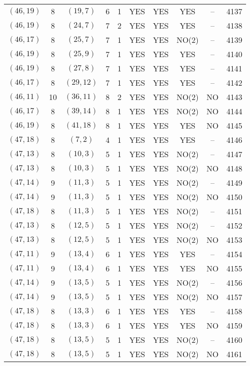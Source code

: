 \begin{longtable}{|c|c|c|c|c|c|c|c|c|c|}
$(46, 19)$ & 8 & $(19, 7)$ & 6 & 1 & YES & YES & YES & -- & 4137\\
$(46, 19)$ & 8 & $(24, 7)$ & 7 & 2 & YES & YES & YES & -- & 4138\\
$(46, 17)$ & 8 & $(25, 7)$ & 7 & 1 & YES & YES & NO(2) & -- & 4139\\
$(46, 19)$ & 8 & $(25, 9)$ & 7 & 1 & YES & YES & YES & -- & 4140\\
$(46, 19)$ & 8 & $(27, 8)$ & 7 & 1 & YES & YES & YES & -- & 4141\\
$(46, 17)$ & 8 & $(29, 12)$ & 7 & 1 & YES & YES & YES & -- & 4142\\
$(46, 11)$ & 10 & $(36, 11)$ & 8 & 2 & YES & YES & NO(2) & NO & 4143\\
$(46, 17)$ & 8 & $(39, 14)$ & 8 & 1 & YES & YES & NO(2) & NO & 4144\\
$(46, 19)$ & 8 & $(41, 18)$ & 8 & 1 & YES & YES & YES & NO & 4145\\
$(47, 18)$ & 8 & $(7, 2)$ & 4 & 1 & YES & YES & YES & -- & 4146\\
$(47, 13)$ & 8 & $(10, 3)$ & 5 & 1 & YES & YES & NO(2) & -- & 4147\\
$(47, 13)$ & 8 & $(10, 3)$ & 5 & 1 & YES & YES & NO(2) & NO & 4148\\
$(47, 14)$ & 9 & $(11, 3)$ & 5 & 1 & YES & YES & NO(2) & -- & 4149\\
$(47, 14)$ & 9 & $(11, 3)$ & 5 & 1 & YES & YES & NO(2) & NO & 4150\\
$(47, 18)$ & 8 & $(11, 3)$ & 5 & 1 & YES & YES & NO(2) & -- & 4151\\
$(47, 13)$ & 8 & $(12, 5)$ & 5 & 1 & YES & YES & NO(2) & -- & 4152\\
$(47, 13)$ & 8 & $(12, 5)$ & 5 & 1 & YES & YES & NO(2) & NO & 4153\\
$(47, 11)$ & 9 & $(13, 4)$ & 6 & 1 & YES & YES & YES & -- & 4154\\
$(47, 11)$ & 9 & $(13, 4)$ & 6 & 1 & YES & YES & YES & NO & 4155\\
$(47, 14)$ & 9 & $(13, 5)$ & 5 & 1 & YES & YES & NO(2) & -- & 4156\\
$(47, 14)$ & 9 & $(13, 5)$ & 5 & 1 & YES & YES & NO(2) & NO & 4157\\
$(47, 18)$ & 8 & $(13, 3)$ & 6 & 1 & YES & YES & YES & -- & 4158\\
$(47, 18)$ & 8 & $(13, 3)$ & 6 & 1 & YES & YES & YES & NO & 4159\\
$(47, 18)$ & 8 & $(13, 5)$ & 5 & 1 & YES & YES & NO(2) & -- & 4160\\
$(47, 18)$ & 8 & $(13, 5)$ & 5 & 1 & YES & YES & NO(2) & NO & 4161\\

\end{longtable}
